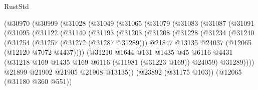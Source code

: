 \begin{lexlean}{RustStd}
\begin{coremodule}
                    (@30970
                      (@30999
                        (@31028
                          (@31049
                            (@31065
                              (@31079
                                (@31083
                                  (@31087
                                    (@31091
                                      (@31095
                                        (@31122
                                          (@31140
                                            (@31193
                                              (@31203
                                                (@31208
                                                  (@31228
                                                    (@31234
                                                      (@31240
                                                        (@31254
                                                          (@31257 (@31272 (@31287 @31289)))
                                                          @21847
                                                          @13135
                                                          @24037
                                                          (@12065 (@12120 @7072 @4437))))
                                                      (@31210
                                                        @1644
                                                        @131
                                                        @1435
                                                        @45
                                                        @6116
                                                        @4431
                                                        (@31218
                                                          @169
                                                          @1435
                                                          @169
                                                          @6116
                                                          (@11981 (@31223 @169))
                                                          @24059)
                                                        @31289))))
                                                @21899
                                                @21902
                                                @21905
                                                @21908
                                                @13135))
                                            (@23892 (@31175 @103))
                                            (@12065 (@31180 @360 @551))

\end{coremodule}
\end{lexlean}
